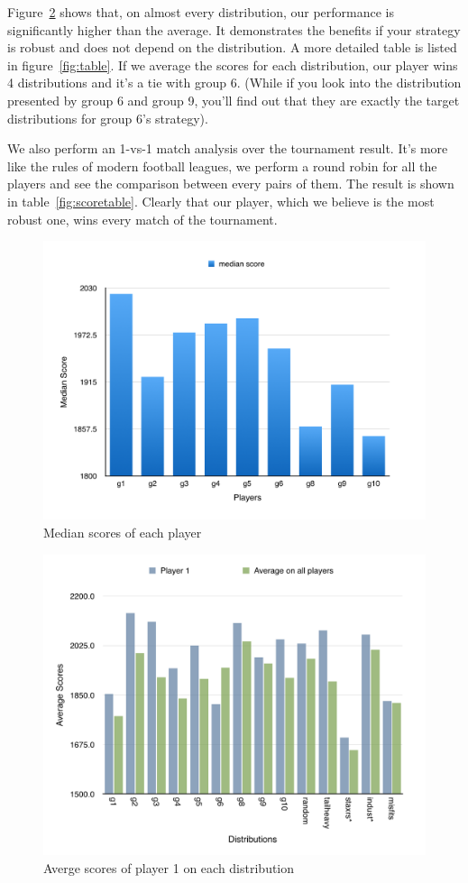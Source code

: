 Figure~\ref{fig:average} shows that, on almost every distribution, our performance is significantly higher than
the average. It demonstrates the benefits if your strategy is robust and does not depend on the distribution.
A more detailed table is listed in figure~\ref{fig:table}. If we average the scores for each distribution, our
player wins 4 distributions and it's a tie with group 6. (While if you look into the distribution presented by
group 6 and group 9, you'll find out that they are exactly the target distributions for group 6's strategy).

We also perform an 1-vs-1 match analysis over the tournament result. It's more like the rules of modern football leagues,
we perform a round robin for all the players and see the comparison between every pairs of them.
The result is shown in table~\ref{fig:scoretable}. Clearly that our player, which we believe is the most robust one,
wins every match of the tournament.

\begin{figure}[t]
\begin{center}
\includegraphics[width=0.8\linewidth]{median.png}
\end{center}
\caption{Median scores of each player}\label{fig:median}
\end{figure}


\begin{figure}[ht]
\begin{center}
\includegraphics[width=0.8\linewidth]{average.png}
\end{center}
\caption{Averge scores of player 1 on each distribution}\label{fig:average}
\end{figure}

